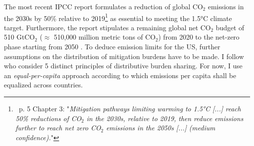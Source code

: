  The most recent IPCC report \citep{IPCC2022} formulates a reduction of global CO$_2$ emissions in the 2030s by 50\% relative to 2019\footnote{\ p. 5 Chapter 3: "\textit{Mitigation pathways limiting warming to 1.5°C [...] reach 50\% reductions of CO$_2$ in the 2030s, relative to 2019, then reduce emissions further to reach net zero CO$_2$ emissions in the 2050s [...] (\textnormal{medium confidence}).}"}  as essential to meeting the 1.5°C climate target.  Furthermore, the report stipulates a remaining global net CO$_2$ budget of 510 GtCO$_2$ ($\approx$ 510,000 million metric tons of CO$_2$) from 2020 to the net-zero phase starting from 2050 \citep[p.5, Chapter3,]{IPCC2022}. 
To deduce emission limits for the US, further assumptions on the distribution of mitigation burdens have to be made. I follow \cite{RobiouDuPont2017EquitableGoals} who consider 5 distinct principles of distributive burden sharing. For now, I use an \textit{equal-per-capita} approach according to which emissions per capita shall be equalized across countries. 
   
